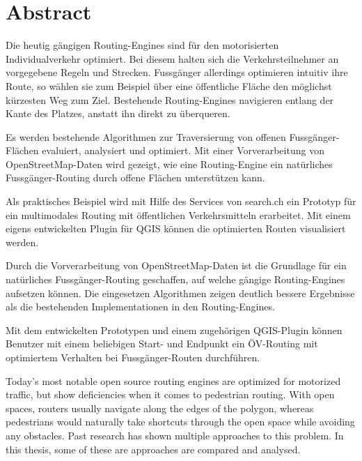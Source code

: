 
\chapter*{Abstract}

Die heutig gängigen Routing-Engines sind für den motorisierten Individualverkehr optimiert. Bei diesem halten sich die Verkehrsteilnehmer an vorgegebene Regeln und Strecken. Fussgänger allerdings optimieren intuitiv ihre Route, so wählen sie zum Beispiel über eine öffentliche Fläche den möglichst kürzesten Weg zum Ziel. Bestehende Routing-Engines navigieren entlang der Kante des Platzes, anstatt ihn direkt zu überqueren.

Es werden bestehende Algorithmen zur Traversierung von offenen Fussgänger-Flächen evaluiert, analysiert und optimiert. Mit einer Vorverarbeitung von OpenStreetMap-Daten wird gezeigt, wie eine Routing-Engine ein natürliches Fussgänger-Routing durch offene Flächen unterstützen kann.

Als praktisches Beispiel wird mit Hilfe des Services von search.ch ein Prototyp für ein multimodales Routing mit öffentlichen Verkehrsmitteln erarbeitet. Mit einem eigens entwickelten Plugin für QGIS können die optimierten Routen visualisiert werden.

Durch die Vorverarbeitung von OpenStreetMap-Daten ist die Grundlage für ein natürliches Fussgänger-Routing geschaffen, auf welche gängige Routing-Engines aufsetzen können. Die eingesetzen Algorithmen zeigen deutlich bessere Ergebnisse als die bestehenden Implementationen in den Routing-Engines.

Mit dem entwickelten Prototypen und einem zugehörigen QGIS-Plugin können Benutzer mit einem beliebigen Start- und Endpunkt ein ÖV-Routing mit optimiertem Verhalten bei Fussgänger-Routen durchführen.

\cleardoublepage

Today's most notable open source routing engines are optimized for motorized traffic, but show deficiencies when it comes to pedestrian routing. With open spaces, routers usually navigate along the edges of the polygon, whereas pedestrians would naturally take shortcuts through the open space while avoiding any obstacles.
Past research has shown multiple approaches to this problem. In this thesis, some of these are approaches are compared and analysed.

